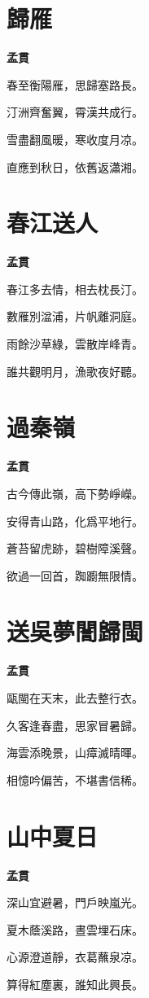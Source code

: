 \documentclass[12pt,a4paper]{ctexbook}
\begin{document}
\section{歸雁}
\textbf{孟貫}\par\vspace{0.5em}
春至衡陽雁，思歸塞路長。\par
汀洲齊奮翼，霄漢共成行。\par
雪盡翻風暖，寒收度月凉。\par
直應到秋日，依舊返瀟湘。\par

\section{春江送人}
\textbf{孟貫}\par\vspace{0.5em}
春江多去情，相去枕長汀。\par
數雁別湓浦，片帆離洞庭。\par
雨餘沙草綠，雲散岸峰青。\par
誰共觀明月，漁歌夜好聽。\par

\section{過秦嶺}
\textbf{孟貫}\par\vspace{0.5em}
古今傳此嶺，高下勢崢嶸。\par
安得青山路，化爲平地行。\par
蒼苔留虎跡，碧樹障溪聲。\par
欲過一回首，踟躕無限情。\par

\section{送吳夢誾歸閩}
\textbf{孟貫}\par\vspace{0.5em}
甌閩在天末，此去整行衣。\par
久客逢春盡，思家冒暑歸。\par
海雲添晚景，山瘴滅晴暉。\par
相憶吟偏苦，不堪書信稀。\par

\section{山中夏日}
\textbf{孟貫}\par\vspace{0.5em}
深山宜避暑，門戶映嵐光。\par
夏木蔭溪路，晝雲埋石床。\par
心源澄道靜，衣葛蘸泉凉。\par
算得紅塵裏，誰知此興長。\par
\end{document}
